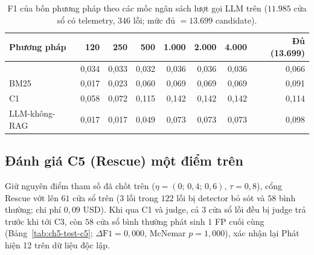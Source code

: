 \begin{table}[htbp]
  \centering
  \caption[Giá trị F1 theo ngân sách lần gọi LLM trên test]{F1 của bốn phương pháp theo các mốc ngân sách lượt gọi LLM trên  ($11.985$ cửa sổ có telemetry, $346$ lỗi; mức đủ $= 13.699$ candidate).}
  \label{tab:ch5-budget}
  \scriptsize
  \renewcommand{\arraystretch}{1.15}
  \begin{tabularx}{\linewidth}{@{}Y r r r r r r r@{}}
    \toprule
    \textbf{Phương pháp} & \textbf{120} & \textbf{250} & \textbf{500} & \textbf{1.000} & \textbf{2.000} & \textbf{4.000} & \textbf{Đủ (13.699)} \\
    \midrule
    \textbf{\CTAV{}} & 0,034 & 0,033 & 0,032 & 0,036 & 0,036 & 0,036 & 0,066 \\
    BM25 & 0,017 & 0,023 & 0,060 & 0,069 & 0,069 & 0,069 & 0,091 \\
    C1 & 0,058 & 0,072 & 0,115 & 0,142 & 0,142 & 0,142 & 0,114 \\
    LLM-không-RAG & 0,017 & 0,017 & 0,049 & 0,073 & 0,073 & 0,073 & 0,098 \\
    \bottomrule
  \end{tabularx}
\end{table}

\subsection{Đánh giá C5 (Rescue) một điểm trên }
\label{sec:ch5-test-c5}

Giữ nguyên điểm tham số đã chốt trên  ($\eta = (0;\, 0{,}4;\, 0{,}6)$, $\tau = 0{,}8$), cổng Rescue vớt lên $61$ cửa sổ trên  ($3$ lỗi trong $122$ lỗi bị detector bỏ sót và $58$ bình thường; chi phí $0{,}09$ USD). Khi qua C1 và judge, cả $3$ cửa sổ lỗi đều bị judge trả  trước khi tới C3, còn $58$ cửa sổ bình thường phát sinh $1$ FP cuối cùng (Bảng~\ref{tab:ch5-test-c5}; $\Delta\text{F1} = 0{,}000$, McNemar $p = 1{,}000$), xác nhận lại Phát hiện 12 trên dữ liệu độc lập.

